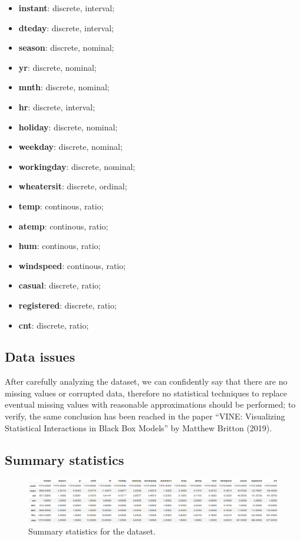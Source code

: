 \documentclass[11pt,a4paper]{article}
\begin{document}
\begin{itemize}
    \item \textbf{instant}: discrete, interval;
    \item \textbf{dteday}: discrete, interval;
    \item \textbf{season}: discrete, nominal;
    \item \textbf{yr}: discrete, nominal;
    \item \textbf{mnth}: discrete, nominal;
    \item \textbf{hr}: discrete, interval; 
    \item \textbf{holiday}: discrete, nominal;
    \item \textbf{weekday}: discrete, nominal;
    \item \textbf{workingday}: discrete, nominal;
    \item \textbf{wheatersit}: discrete, ordinal;
    \item \textbf{temp}: continous, ratio;
    \item \textbf{atemp}: continous, ratio;
    \item \textbf{hum}: continous, ratio;
    \item \textbf{windspeed}: continous, ratio;
    \item \textbf{casual}: discrete, ratio;
    \item \textbf{registered}: discrete, ratio;
    \item \textbf{cnt}: discrete, ratio;
\end{itemize}

\subsection{Data issues}

After carefully analyzing the dataset, we can confidently say that there are no missing values or corrupted data, therefore no statistical techniques to replace eventual missing values with reasonable approximations should be performed; to verify, the same conclusion has been reached in the paper “VINE: Visualizing Statistical Interactions in Black Box Models” by Matthew Britton (2019).

\subsection{Summary statistics}

\begin{figure}[H]
    \centering
    \includegraphics[width=\textwidth, height=0.3\textwidth]{res/summary.png}
    \caption{Summary statistics for the dataset.}
    \label{fig:summary}
\end{figure}
\end{document}
